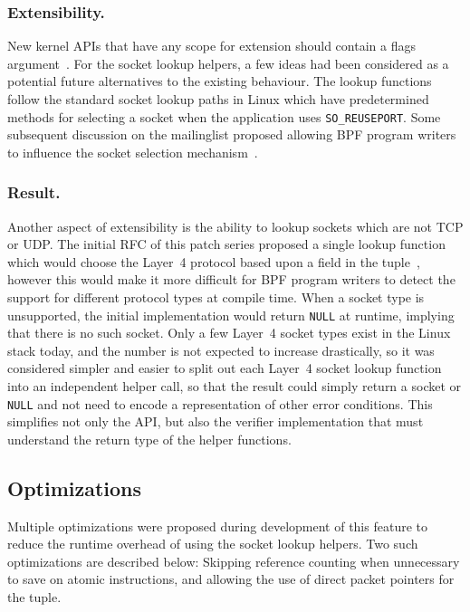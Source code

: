 \documentclass[10pt,sigconf,authorversion]{lpc}
\begin{document}
\subsubsection{Extensibility.}

New kernel APIs that have any scope for extension should contain a flags
argument~\cite{syscall-flags}. For the socket lookup helpers, a few ideas had
been considered as a potential future alternatives to the existing behaviour.
The lookup functions follow the standard socket lookup paths in Linux which
have predetermined methods for selecting a socket when the application uses
\verb+SO_REUSEPORT+. Some subsequent discussion on the mailinglist proposed
allowing BPF program writers to influence the socket selection
mechanism~\cite{netdev-sk-select}.

\subsubsection{Result.}

Another aspect of extensibility is the ability to lookup sockets which are not
TCP or UDP. The initial RFC of this patch series proposed a single lookup
function which would choose the Layer~4 protocol based upon a field in the
tuple~\cite{sk-lookup-rfc}, however this would make it more difficult for BPF
program writers to detect the support for different protocol types at compile
time. When a socket type is unsupported, the initial implementation would
return \verb+NULL+ at runtime, implying that there is no such socket. Only a
few Layer~4 socket types exist in the Linux stack today, and the number is not
expected to increase drastically, so it was considered simpler and easier to
split out each Layer~4 socket lookup function into an independent helper call,
so that the result could simply return a socket or \verb+NULL+ and not need to
encode a representation of other error conditions. This simplifies not only the
API, but also the verifier implementation that must understand the return type
of the helper functions.

\subsection{Optimizations}

Multiple optimizations were proposed during development of this feature to
reduce the runtime overhead of using the socket lookup helpers. Two such
optimizations are described below: Skipping reference counting when unnecessary
to save on atomic instructions, and allowing the use of direct packet pointers
for the tuple.
\end{document}
